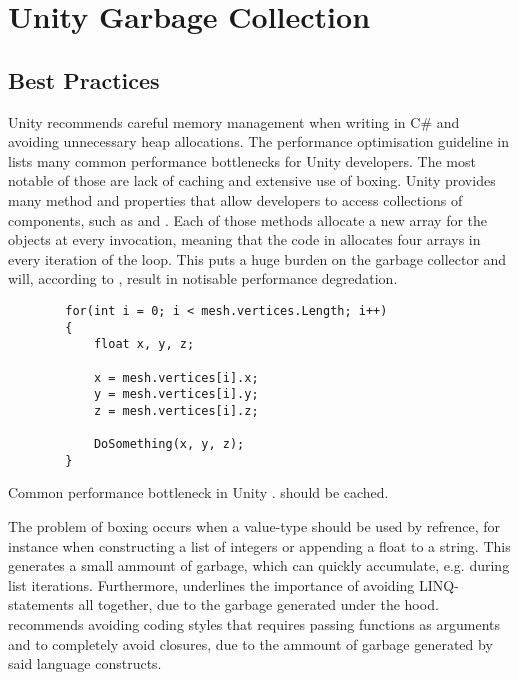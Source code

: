\section{Unity Garbage Collection}

\subsection{Best Practices}
Unity recommends careful memory management when writing in C\# and avoiding unnecessary heap allocations\cite{unity:optimisation}. The performance optimisation guideline in \cite{unity:optimisation} lists many common performance bottlenecks for Unity developers. The most notable of those are lack of caching and extensive use of boxing. Unity provides many method and properties that allow developers to access collections of components, such as  and \cite{unity:optimisation, unity:heap}. Each of those methods allocate a new array for the objects at every invocation, meaning that the code in  allocates four arrays in every iteration of the loop. This puts a huge burden on the garbage collector and will, according to \cite{unity:heap}, result in notisable performance degredation.

\begin{listing}
    \begin{verbatim}
        for(int i = 0; i < mesh.vertices.Length; i++)
        {
            float x, y, z;
        
            x = mesh.vertices[i].x;
            y = mesh.vertices[i].y;
            z = mesh.vertices[i].z;
        
            DoSomething(x, y, z);
        }
    \end{verbatim}
    \caption{Common performance bottleneck in Unity \cite{unity:heap}.  should be cached.} \label{lst:unity:array:prop}
\end{listing}

The problem of boxing occurs when a value-type should be used by refrence, for instance when constructing a list of integers or appending a float to a string. This generates a small ammount of garbage, which can quickly accumulate, e.g. during list iterations. Furthermore, \cite{unity:optimisation} underlines the importance of avoiding \gls{LINQ}-statements all together, due to the garbage generated under the hood. \cite{unity:heap} recommends avoiding coding styles that requires passing functions as arguments and to completely avoid closures, due to the ammount of garbage generated by said language constructs. 

